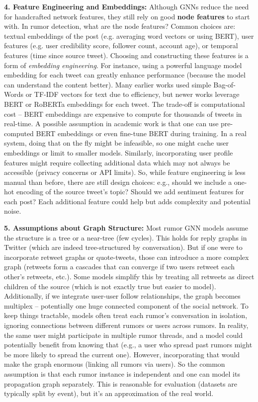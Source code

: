 \documentclass[12pt,a4paper]{report}
\begin{document}
\textbf{4. Feature Engineering and Embeddings:} Although GNNs reduce the need for handcrafted network features, they still rely on good \textbf{node features} to start with. In rumor detection, what are the node features? Common choices are: textual embeddings of the post (e.g. averaging word vectors or using BERT), user features (e.g. user credibility score, follower count, account age), or temporal features (time since source tweet). Choosing and constructing these features is a form of \textit{embedding engineering}. For instance, using a powerful language model embedding for each tweet can greatly enhance performance (because the model can understand the content better). Many earlier works used simple Bag-of-Words or TF-IDF vectors for text due to efficiency, but newer works leverage BERT or RoBERTa embeddings for each tweet. The trade-off is computational cost – BERT embeddings are expensive to compute for thousands of tweets in real-time. A possible assumption in academic work is that one can use pre-computed BERT embeddings or even fine-tune BERT during training. In a real system, doing that on the fly might be infeasible, so one might cache user embeddings or limit to smaller models. Similarly, incorporating user profile features might require collecting additional data which may not always be accessible (privacy concerns or API limits). So, while feature engineering is less manual than before, there are still design choices: e.g., should we include a one-hot encoding of the source tweet’s topic? Should we add sentiment features for each post? Each additional feature could help but adds complexity and potential noise.

\textbf{5. Assumptions about Graph Structure:} Most rumor GNN models assume the structure is a tree or a near-tree (few cycles). This holds for reply graphs in Twitter (which are indeed tree-structured by conversation). But if one were to incorporate retweet graphs or quote-tweets, those can introduce a more complex graph (retweets form a cascades that can converge if two users retweet each other’s retweets, etc.). Some models simplify this by treating all retweets as direct children of the source (which is not exactly true but easier to model). Additionally, if we integrate user-user follow relationships, the graph becomes multiplex – potentially one huge connected component of the social network. To keep things tractable, models often treat each rumor’s conversation in isolation, ignoring connections between different rumors or users across rumors. In reality, the same user might participate in multiple rumor threads, and a model could potentially benefit from knowing that (e.g., a user who spread past rumors might be more likely to spread the current one). However, incorporating that would make the graph enormous (linking all rumors via users). So the common assumption is that each rumor instance is independent and one can model its propagation graph separately. This is reasonable for evaluation (datasets are typically split by event), but it’s an approximation of the real world.
\end{document}
